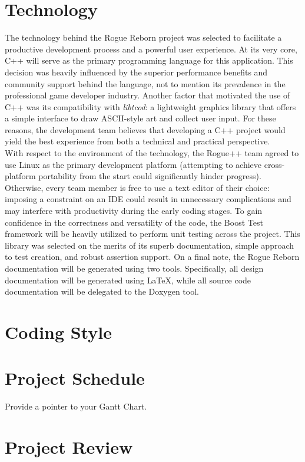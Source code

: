 \documentclass{article}
\begin{document}
\section{Technology}

The technology behind the Rogue Reborn project was selected to facilitate a productive development process and a powerful user experience. At its very core, C++ will serve as the primary programming language for this application.  This decision was heavily influenced by the superior performance benefits and community support behind the language, not to mention its prevalence in the professional game developer industry.  Another factor that motivated the use of C++ was its compatibility with \textit{libtcod}: a lightweight graphics library that offers a simple interface to draw ASCII-style art and collect user input.  For these reasons, the development team believes that developing a C++ project would yield the best experience from both a technical and practical perspective.\\

With respect to the environment of the technology, the Rogue++ team agreed to use Linux as the primary development platform (attempting to achieve cross-platform portability from the start could significantly hinder progress).  Otherwise, every team member is free to use a text editor of their choice: imposing a constraint on an IDE could result in unnecessary complications and may interfere with productivity during the early coding stages.  To gain confidence in the correctness and versatility of the code, the Boost Test framework will be heavily utilized to perform unit testing across the project.  This library was selected on the merits of its superb documentation, simple approach to test creation, and robust assertion support.  On a final note, the Rogue Reborn documentation will be generated using two tools.  Specifically, all design documentation will be generated using LaTeX, while all source code documentation will be delegated to the Doxygen tool.

\section{Coding Style}

\section{Project Schedule}

Provide a pointer to your Gantt Chart.

\section{Project Review}
\end{document}
